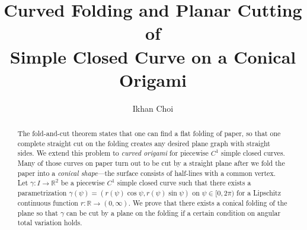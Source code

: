 \documentclass{amsart}
\theoremstyle{plain}
\theoremstyle{definition}
\theoremstyle{remark}
\begin{document}
\title[Fold-and-Cut of Simple Closed Curve under Conical Origami]
{Curved Folding and Planar Cutting of \\ Simple Closed Curve on a Conical Origami}

\author[I. Choi]{Ikhan Choi}
\address{Seoul Science High School, 63 Hyehwa-ro Jongno-gu Seoul, South Korea}





\begin{abstract}
The fold-and-cut theorem states that one can find a flat folding of paper, so that 
one complete straight cut on the folding creates any desired plane graph with straight sides. 
We extend this problem to \emph{curved origami} for piecewise $C^1$ simple closed curves.
Many of those curves on paper turn out to be cut by a straight plane 
after we fold the paper into a \emph{conical shape}---the surface consists of half-lines with a common vertex.
Let $\gamma \colon I\to\mathbb{R}^2$ be a piecewise $C^1$ simple closed curve such that there exists a parametrization $\gamma(\psi)=(r(\psi)\cos\psi,r(\psi)\sin\psi)$ on $\psi\in[0,2\pi)$ for a Lipschitz continuous function $r \colon \mathbb{R}\to(0,\infty)$.
We prove that there exists a conical folding of the plane so that $\gamma$ can be cut by a plane on the folding 
if a certain condition on angular total variation holds. 
\end{abstract}



\maketitle
\end{document}
